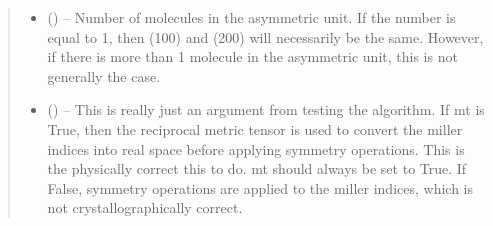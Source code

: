 \documentclass[letterpaper,10pt,english,openany,oneside]{sphinxmanual}
\begin{document}
\begin{fulllineitems}
\begin{fulllineitems}
\begin{quote}
\begin{description}
\begin{itemize}
\item {} 
 () -- Number of molecules in the asymmetric unit. If the number is equal
to 1, then (100) and (200) will necessarily be the same. However,
if there is more than 1 molecule in the asymmetric unit, this
is not generally the case.

\item {} 
 () -- This is really just an argument from testing the algorithm.
If mt is True, then the reciprocal metric tensor is used to convert
the miller indices into real space before applying symmetry
operations. This is the physically correct this to do. mt should
always be set to True. If False, symmetry operations are applied
to the miller indices, which is not crystallographically correct.

\end{itemize}

\end{description}\end{quote}

\end{fulllineitems}


\end{fulllineitems}

\end{document}
